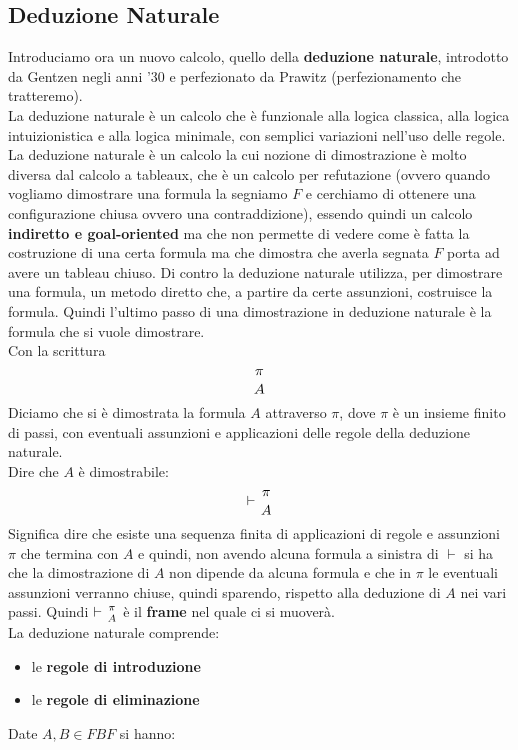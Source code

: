 \documentclass[a4paper,12pt, oneside]{book}
\newcommand*{\bfrac}[2]{\genfrac{}{}{0pt}{}{#1}{#2}}
\begin{document}
\subsection{Deduzione Naturale}
Introduciamo ora un nuovo calcolo, quello della \textbf{deduzione naturale},
introdotto da Gentzen negli anni '30 e perfezionato da Prawitz (perfezionamento
che tratteremo).\\
La deduzione naturale è un calcolo che è funzionale alla logica classica, alla
logica intuizionistica e alla logica minimale, con semplici variazioni nell'uso
delle regole.\\
La deduzione naturale è un calcolo la cui nozione di dimostrazione è molto
diversa dal calcolo a tableaux, che è un calcolo per refutazione (ovvero quando
vogliamo dimostrare una formula la segniamo $F$ e cerchiamo di ottenere una
configurazione chiusa ovvero una contraddizione), essendo quindi un calcolo
\textbf{indiretto e goal-oriented} ma che non permette di vedere come è fatta la
costruzione di una certa formula ma che dimostra che averla segnata $F$ porta ad
avere un tableau chiuso. Di contro la deduzione naturale utilizza, per
dimostrare una formula, un metodo diretto che, a partire da certe assunzioni,
costruisce la formula. Quindi l'ultimo passo di una dimostrazione in deduzione
naturale è la formula che si vuole dimostrare. \\
Con la scrittura
\[\bfrac{\pi}{A}\]
Diciamo che si è dimostrata la formula $A$ attraverso $\pi$, dove $\pi$ è un
insieme finito di passi, con eventuali assunzioni e applicazioni delle regole
della deduzione naturale.\\
Dire che $A$ è dimostrabile:
\[\vdash\bfrac{\pi}{A}\]
Significa dire che esiste una sequenza finita di applicazioni di regole e
assunzioni $\pi$ che termina con $A$ e quindi, non avendo alcuna formula a
sinistra di $\vdash$ si ha che la dimostrazione di $A$ non dipende da alcuna
formula e che in $\pi$ le eventuali assunzioni verranno chiuse, quindi sparendo,
rispetto alla deduzione di $A$ nei vari passi. Quindi $\vdash\bfrac{\pi}{A}$ è
il \textbf{frame} nel quale ci si muoverà.\\
La deduzione naturale comprende:
\begin{itemize}
  \item le \textbf{regole di introduzione}
  \item le \textbf{regole di eliminazione}
\end{itemize}
Date $A,B\in FBF$ si hanno:
\end{document}
